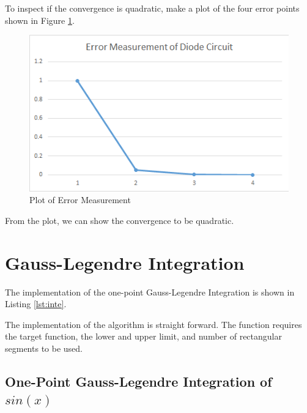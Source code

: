 \documentclass[a4paper,titlepage]{article}
\begin{document}
			To inspect if the convergence is quadratic, make a plot of the four error points shown in Figure \ref{err_measure}.
			\begin{figure}[!h]
				\centering
				\includegraphics[width=\linewidth]{../data/diode_err}
				\caption{Plot of Error Measurement}
				\label{err_measure}
			\end{figure}
		
			From the plot, we can show the convergence to be quadratic. 
			
	\section{Gauss-Legendre Integration}
		The implementation of the one-point Gauss-Legendre Integration is shown in Listing \ref{lst:inte}.
		
		The implementation of the algorithm is straight forward. The function requires the target function, the lower and upper limit, and number of rectangular segments to be used. 
		\subsection{One-Point Gauss-Legendre Integration of $sin(x)$}
			
\end{document}
